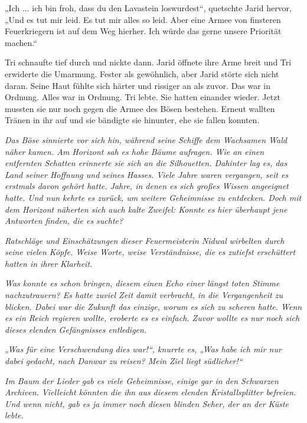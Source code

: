 „Ich ... ich bin froh, dass du den Lavastein loswurdest“, quetschte Jarid hervor, „Und es tut mir leid. Es tut mir alles so leid. Aber eine Armee von finsteren Feuerkriegern ist auf dem Weg hierher. Ich würde das gerne unsere Priorität machen.“

Tri schnaufte tief durch und nickte dann. Jarid öffnete ihre Arme breit und Tri erwiderte die Umarmung. Fester als gewöhnlich, aber Jarid störte sich nicht daran. Seine Haut fühlte sich härter und rissiger an als zuvor. Das war in Ordnung. Alles war in Ordnung. Tri lebte. Sie hatten einander wieder. Jetzt mussten sie nur noch gegen die Armee des Bösen bestehen. Erneut wallten Tränen in ihr auf und sie bändigte sie hinunter, ehe sie fallen konnten.



\trennzeichen



\textit{Das Böse sinnierte vor sich hin, während seine Schiffe dem Wachsamen Wald näher kamen. Am Horizont sah es hohe Bäume aufragen. Wie an einen entfernten Schatten erinnerte sie sich an die Silhouetten. Dahinter lag es, das Land seiner Hoffnung und seines Hasses. Viele Jahre waren vergangen, seit es erstmals davon gehört hatte. Jahre, in denen es sich großes Wissen angeeignet hatte. Und nun kehrte es zurück, um weitere Geheimnisse zu entdecken. Doch mit dem Horizont näherten sich auch kalte Zweifel: Konnte es hier überhaupt jene Antworten finden, die es suchte?}

\textit{Ratschläge und Einschätzungen dieser Feuermeisterin Nidwal wirbelten durch seine vielen Köpfe. Weise Worte, weise Verständnisse, die es zutiefst erschüttert hatten in ihrer Klarheit.}

\textit{Was konnte es schon bringen, diesem einen Echo einer längst toten Stimme nachzutrauern? Es hatte zuviel Zeit damit verbracht, in die Vergangenheit zu blicken. Dabei war die Zukunft das einzige, worum es sich zu scheren hatte. Wenn es ein Reich regieren wollte, eroberte es es einfach. Zuvor wollte es nur noch sich dieses elenden Gefängnisses entledigen.}

\textit{„Was für eine Verschwendung dies war!“, knurrte es, „Was habe ich mir nur dabei gedacht, nach Danwar zu reisen? Mein Ziel liegt südlicher!“}

\textit{Im Baum der Lieder gab es viele Geheimnisse, einige gar in den Schwarzen Archiven. Vielleicht könnten die ihn aus diesem elenden Kristallsplitter befreien. Und wenn nicht, gab es ja immer noch diesen blinden Seher, der an der Küste lebte.}

